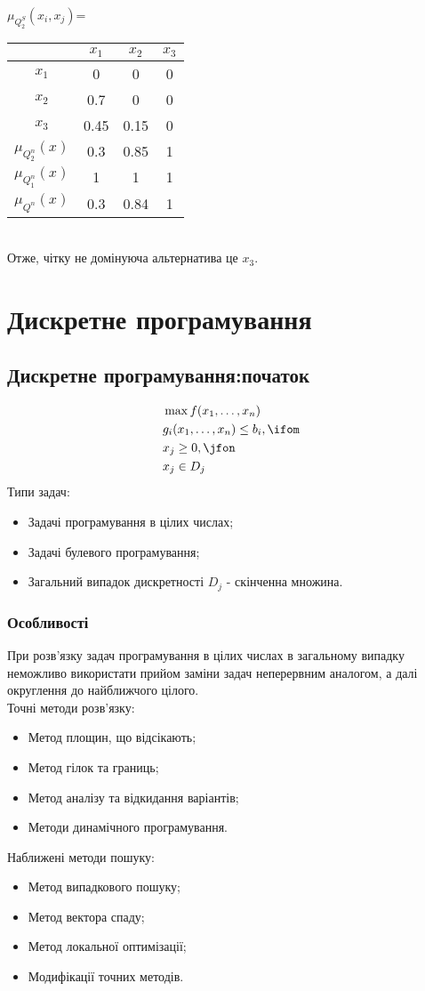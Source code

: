 \begin{exs}
$\mu_{Q_2^S}(x_i,x_j)$=\begin{tabular}{c|c|c|c}
 & $x_1$ & $x_2$ & $x_3$ \\ 
\hline 
$x_1$ & 0 & 0  &0  \\ 
\hline 
$x_2$ & 0.7 & 0 & 0  \\ 
\hline 
$x_3$ & 0.45 & 0.15 & 0 \\ 
\hline
$\mu_{Q_2^n}(x)$ & 0.3 & 0.85 & 1 \\
\hline 
$\mu_{Q_1^n}(x)$ & 1 & 1 &1 \\
\hline 
$\mu_{Q^n}(x)$ & 0.3 & 0.84 & 1
\end{tabular} \\
Отже, чітку не домінуюча альтернатива це $x_3$.
\end{exs}
\chapter{Дискретне програмування}
\section{Дискретне програмування:початок}
\begin{eqnarray}
&\max f(x_1,\ldots,x_n)\\
& g_i(x_1,\ldots,x_n)\leq b_i,\ifom\\
&x_j\geq0,\jfon\\
&x_j\in D_j
\end{eqnarray}
Типи задач:
\begin{itemize}
\item Задачі програмування в цілих числах;
\item Задачі булевого програмування;
\item Загальний випадок дискретності $D_j$ - скінченна множина.
\end{itemize}
\subsection{Особливості}
При розв’язку задач програмування в цілих числах в загальному випадку неможливо використати прийом заміни задач неперервним аналогом, а далі округлення до найближчого цілого.\\
Точні методи розв’язку:
\begin{itemize}
\item Метод площин, що відсікають;
\item Метод гілок та границь;
\item Метод аналізу та відкидання варіантів;
\item Методи динамічного програмування.
\end{itemize}
Наближені методи пошуку:
\begin{itemize}
\item Метод випадкового пошуку;
\item Метод вектора спаду;
\item Метод локальної оптимізації;
\item Модифікації точних методів.
\end{itemize}
